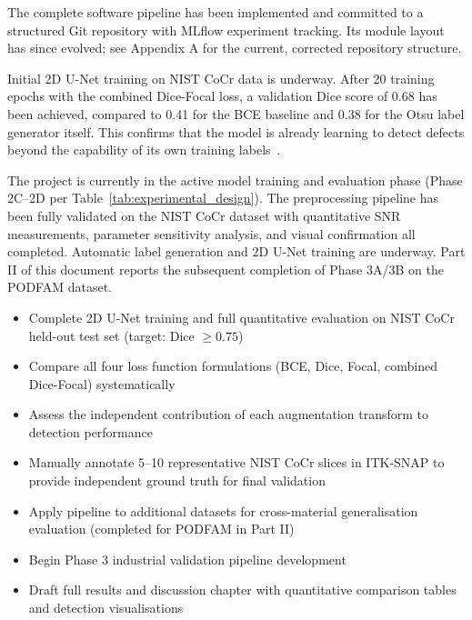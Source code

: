The complete software pipeline has been implemented and committed to a structured Git repository with
MLflow experiment tracking. Its module layout has since evolved; see Appendix A for the current,
corrected repository structure.

Initial 2D U-Net training on NIST CoCr data is underway. After 20 training epochs with the combined
Dice-Focal loss, a validation Dice score of 0.68 has been achieved, compared to 0.41 for the BCE
baseline and 0.38 for the Otsu label generator itself. This confirms that the model is already
learning to detect defects beyond the capability of its own training labels~\citep{Yosifov2020}.

The project is currently in the active model training and evaluation phase (Phase 2C--2D per
Table~\ref{tab:experimental_design}). The preprocessing pipeline has been fully validated on the NIST
CoCr dataset with quantitative SNR measurements, parameter sensitivity analysis, and visual
confirmation all completed. Automatic label generation and 2D U-Net training are underway. Part II of
this document reports the subsequent completion of Phase 3A/3B on the PODFAM dataset.

\begin{itemize}
\item Complete 2D U-Net training and full quantitative evaluation on NIST CoCr held-out test set
  (target: Dice $\geq 0.75$)
\item Compare all four loss function formulations (BCE, Dice, Focal, combined Dice-Focal)
  systematically
\item Assess the independent contribution of each augmentation transform to detection performance
\item Manually annotate 5--10 representative NIST CoCr slices in ITK-SNAP to provide independent
  ground truth for final validation
\item Apply pipeline to additional datasets for cross-material generalisation evaluation (completed
  for PODFAM in Part II)
\item Begin Phase 3 industrial validation pipeline development
\item Draft full results and discussion chapter with quantitative comparison tables and detection
  visualisations
\end{itemize}
